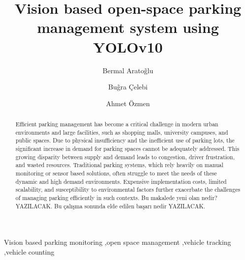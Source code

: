 \documentclass[5p,twocolumn,english]{elsarticle}
\begin{document}
%
\begin{frontmatter}

\title{Vision based open-space parking management system using YOLOv10}

\author[first]{Bermal Arato\~glu}%

\author[first]{Bu\~gra \c{C}elebi}%

\author[first]{Ahmet \"Ozmen}%


\address[first]{Department of Software Engineering, Sakarya University, Sakarya, 54050, TURKEY}%

\begin{abstract}

Efficient parking management has become a critical challenge in modern urban environments and large facilities, such as shopping malls, university campuses, and public spaces. Due to physical insufficiency and the inefficient use of parking lots, the significant increase in demand for parking spaces cannot be adequately addressed. This growing disparity between supply and demand leads to congestion, driver frustration, and wasted resources. Traditional parking systems, which rely heavily on manual monitoring or sensor based solutions, often struggle to meet the needs of these dynamic and high demand environments. Expensive implementation costs, limited scalability, and susceptibility to environmental factors further exacerbate the challenges of managing parking efficiently in such contexts. Bu makalede yeni olan nedir? YAZILACAK. Bu çalışma sonunda elde edilen başarı nedir YAZILACAK.
\end{abstract}

\begin{keyword}
  Vision based parking monitoring \sep open space management \sep vehicle tracking \sep vehicle counting
\end{keyword}


\end{frontmatter}

\end{document}
